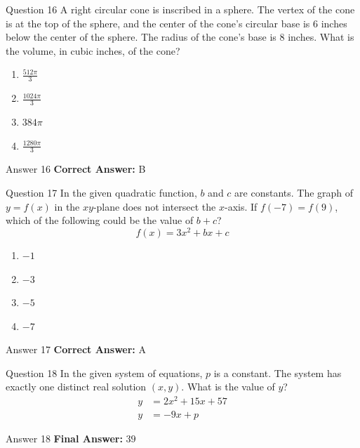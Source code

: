 \documentclass{beamer}
\begin{document}
\begin{frame}{Question 16}
\small
A right circular cone is inscribed in a sphere. The vertex of the cone is at the
top of the sphere, and the center of the cone's circular base is \(6\) inches
below the center of the sphere. The radius of the cone's base is \(8\) inches.
What is the volume, in cubic inches, of the cone?
\vspace{0.35cm}
\begin{enumerate}
    \item[A.] \(\frac{512\pi}{3}\)
    \item[B.] \(\frac{1024\pi}{3}\)
    \item[C.] \(384\pi\)
    \item[D.] \(\frac{1280\pi}{3}\)
\end{enumerate}
\end{frame}
\begin{frame}{Answer 16}
\small
\textbf{Correct Answer:} B
\end{frame}

\begin{frame}{Question 17}
\small
In the given quadratic function, \(b\) and \(c\) are constants. The graph of
\(y=f(x)\) in the \(xy\)-plane does not intersect the \(x\)-axis. If
\(f(-7)=f(9)\), which of the following could be the value of \(b+c\)?
\[
f(x)=3x^2+bx+c
\]
\vspace{0.35cm}
\begin{enumerate}
    \item[A.] \(-1\)
    \item[B.] \(-3\)
    \item[C.] \(-5\)
    \item[D.] \(-7\)
\end{enumerate}
\end{frame}
\begin{frame}{Answer 17}
\small
\textbf{Correct Answer:} A
\end{frame}

\begin{frame}{Question 18}
\small
In the given system of equations, \(p\) is a constant. The system has exactly one
distinct real solution \((x,y)\). What is the value of \(y\)?
\[
\begin{aligned}
y&=2x^2+15x+57\\
y&=-9x+p
\end{aligned}
\]
\end{frame}
\begin{frame}{Answer 18}
\small
\textbf{Final Answer:} $\boxed{39}$
\end{frame}
\end{document}
